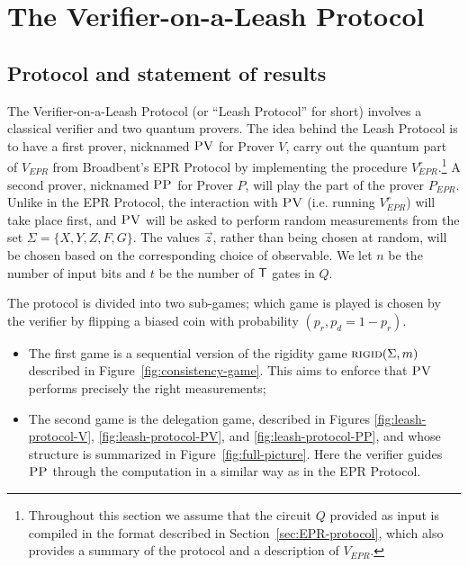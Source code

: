 


\section{The Verifier-on-a-Leash Protocol}
\label{sec:leash}




\subsection{Protocol and statement of results}
\label{sec:leash subsec}

The Verifier-on-a-Leash Protocol (or ``Leash Protocol'' for short) involves a classical verifier and two quantum provers.
The idea behind the Leash Protocol is to have a first prover, nicknamed $\textsc{PV}$ for Prover $V$, carry out the quantum part of $V_{EPR}$ from Broadbent's EPR Protocol by implementing the procedure $V_{EPR}^r$.\footnote{Throughout this section we assume that the circuit $Q$ provided as input is compiled in the format described in Section~\ref{sec:EPR-protocol}, which also provides a summary of the protocol and a description of $V_{EPR}$.} A second prover, nicknamed $\textsc{PP}$ for Prover $P$, will play the part of the prover $P_{EPR}$. Unlike in the EPR Protocol, the interaction with $\textsc{PV}$ (i.e. running $V_{EPR}^r$) will take place {first}, and $\textsc{PV}$ will be asked to perform {random} measurements from the set $\Sigma = \{X,Y,Z,F,G\}$. The values $\vec{z}$, rather than being chosen at random, will be chosen based on the corresponding choice of observable. We let $n$ be the number of input bits and $t$ be the number of $\sf T$ gates in $Q$. 

The protocol is divided into two sub-games; which game is played is chosen by the verifier by flipping a biased coin with probability $(p_r,p_d=1-p_r)$.
\begin{itemize}[nolistsep]
\item The first game is a sequential version of the rigidity game $\textsc{rigid}(\Sigma,m)$ described in Figure~\ref{fig:consistency-game}. This aims to enforce that $\textsc{PV}$ performs precisely the right measurements;

\item The second game is the delegation game, described in Figures \ref{fig:leash-protocol-V}, \ref{fig:leash-protocol-PV}, and \ref{fig:leash-protocol-PP}, and whose structure is summarized in Figure~\ref{fig:full-picture}. Here the verifier guides $\textsc{PP}$ through the computation in a similar way as in the EPR Protocol.
\end{itemize}

